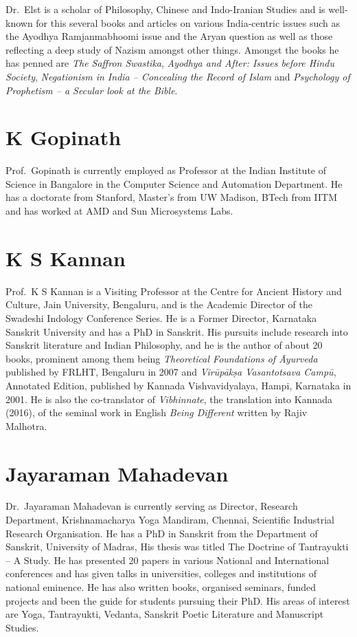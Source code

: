 Dr.~Elst is a scholar of Philosophy, Chinese and Indo-Iranian Studies and is well-known for this several books and articles on various India-centric issues such as the Ayodhya Ramjanmabhoomi issue and the Aryan question as well as those reflecting a deep study of Nazism amongst other things. Amongst the books he has penned are {\sl The Saffron Swastika}, {\sl Ayodhya and After: Issues before Hindu Society}, {\sl Negationism in India – Concealing the Record of Islam} and {\sl Psychology of Prophetism – a Secular look at the Bible}. 

\section*{K Gopinath}

Prof.~Gopinath is currently employed as Professor at the Indian Institute of Science in Bangalore in the Computer Science and Automation Department. He has a doctorate from Stanford, Master’s from UW Madison, BTech from IITM and has worked at AMD and Sun Microsystems Labs.

\section*{K S Kannan}

Prof.~K S Kannan is a Visiting Professor at the Centre for Ancient History and Culture, Jain University, Bengaluru, and is the Academic Director of the Swadeshi Indology Conference Series. He is a Former Director, Karnataka Sanskrit University and has a PhD in Sanskrit. His pursuits include research into Sanskrit literature and Indian Philosophy, and he is the author of about 20 books, prominent among them being {\sl Theoretical Foundations of Āyurveda} published by FRLHT, Bengaluru in 2007 and {\sl Virūpākṣa Vasantotsava Campū}, Annotated Edition, published by Kannada Vishvavidyalaya, Hampi, Karnataka in 2001. He is also the co-translator of {\sl Vibhinnate}, the translation into Kannada (2016), of the seminal work in English {\sl Being Different} written by Rajiv Malhotra.

\section*{Jayaraman Mahadevan}

Dr.~Jayaraman Mahadevan is currently serving as Director, Research Department, Krishnamacharya Yoga Mandiram, Chennai, Scientific Industrial Research Organisation. He has a PhD in Sanskrit from the Department of Sanskrit, University of Madras, His thesis was titled The Doctrine of Tantrayukti – A Study. He has presented 20 papers in various National and International conferences and has given talks in universities, colleges and institutions of national eminence. He has also written books, organised seminars, funded projects and been the guide for students pursuing their PhD\@. His areas of interest are Yoga, Tantrayukti, Vedanta, Sanskrit Poetic Literature and Manuscript Studies.

